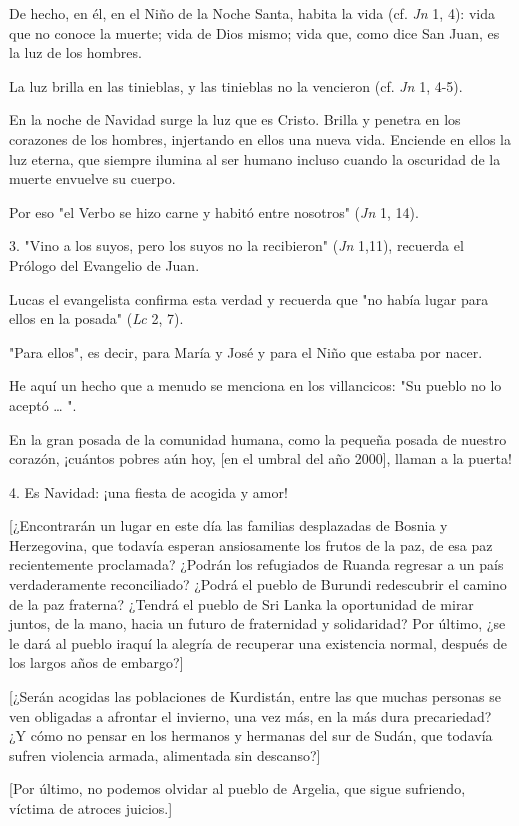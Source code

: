 \begin{body}
\begin{body}
De hecho, en él, en el Niño de la Noche Santa, habita la vida (cf. \emph{Jn} 1, 4): vida que no conoce la muerte; vida de Dios mismo; vida que, como dice San Juan, es la luz de los hombres.

La luz brilla en las tinieblas, y las tinieblas no la vencieron (cf. \emph{Jn} 1, 4-5).

En la noche de Navidad surge la luz que es Cristo. Brilla y penetra en los corazones de los hombres, injertando en ellos una nueva vida. Enciende en ellos la luz eterna, que siempre ilumina al ser humano incluso cuando la oscuridad de la muerte envuelve su cuerpo.

Por eso "el Verbo se hizo carne y habitó entre nosotros" (\emph{Jn} 1, 14).

3. "Vino a los suyos, pero los suyos no la recibieron" (\emph{Jn} 1,11), recuerda el Prólogo del Evangelio de Juan.

Lucas el evangelista confirma esta verdad y recuerda que "no había lugar para ellos en la posada" (\emph{Lc} 2, 7).

"Para ellos", es decir, para María y José y para el Niño que estaba por nacer.

He aquí un hecho que a menudo se menciona en los villancicos: "Su pueblo no lo aceptó \ldots{} ".

En la gran posada de la comunidad humana, como la pequeña posada de nuestro corazón, ¡cuántos pobres aún hoy, {[}en el umbral del año 2000{]}, llaman a la puerta!

4. Es Navidad: ¡una fiesta de acogida y amor!

{[}¿Encontrarán un lugar en este día las familias desplazadas de Bosnia y Herzegovina, que todavía esperan ansiosamente los frutos de la paz, de esa paz recientemente proclamada? ¿Podrán los refugiados de Ruanda regresar a un país verdaderamente reconciliado? ¿Podrá el pueblo de Burundi redescubrir el camino de la paz fraterna? ¿Tendrá el pueblo de Sri Lanka la oportunidad de mirar juntos, de la mano, hacia un futuro de fraternidad y solidaridad? Por último, ¿se le dará al pueblo iraquí la alegría de recuperar una existencia normal, después de los largos años de embargo?{]}

{[}¿Serán acogidas las poblaciones de Kurdistán, entre las que muchas personas se ven obligadas a afrontar el invierno, una vez más, en la más dura precariedad? ¿Y cómo no pensar en los hermanos y hermanas del sur de Sudán, que todavía sufren violencia armada, alimentada sin descanso?{]}

{[}Por último, no podemos olvidar al pueblo de Argelia, que sigue sufriendo, víctima de atroces juicios.{]}


\end{body}
\end{body}
